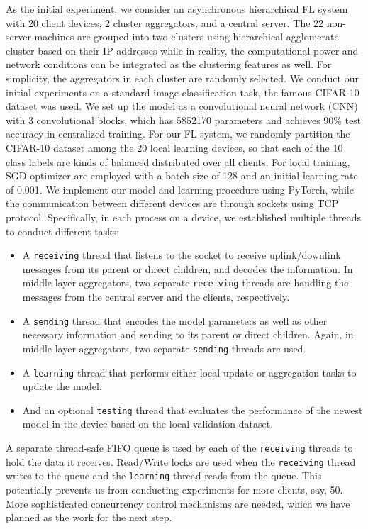 \documentclass[10pt,twocolumn,letterpaper]{article}
\theoremstyle{definition}
\begin{document}
As the initial experiment, we consider an asynchronous hierarchical FL system with 20 client devices, 2 cluster aggregators, and a central server. The 22 non-server machines are grouped into two clusters using hierarchical agglomerate cluster based on their IP addresses while in reality, the computational power and network conditions can be integrated as the clustering features as well. For simplicity, the aggregators in each cluster are randomly selected. We conduct our initial experiments on a standard image classification task, the famous CIFAR-10 dataset was used. We set up the model as a convolutional neural network (CNN) with 3 convolutional blocks, which has 5852170 parameters and achieves 90\% test accuracy in centralized training. For our FL system, we randomly partition the CIFAR-10 dataset among the 20 local learning devices, so that each of the 10 class labels are kinds of balanced distributed over all clients. For local training, SGD optimizer are employed with a batch size of 128 and an initial learning rate of 0.001. We implement our model and learning procedure using PyTorch, while the communication between different devices are through sockets using TCP protocol. Specifically, in each process on a device, we established multiple threads to conduct different tasks: 
\begin{itemize}
    \item A \texttt{receiving} thread that listens to the socket to receive uplink/downlink messages from its parent or direct children, and decodes the information. In middle layer aggregators, two separate \texttt{receiving} threads are handling the messages from the central server and the clients, respectively.
    \item A \texttt{sending} thread that encodes the model parameters as well as other necessary information and sending to its parent or direct children. Again, in middle layer aggregators, two separate \texttt{sending} threads are used.
    \item A \texttt{learning} thread that performs either local update or aggregation tasks to update the model. 
    \item And an optional \texttt{testing} thread that evaluates the performance of the newest model in the device based on the local validation dataset. 
\end{itemize}

A separate thread-safe FIFO queue is used by each of the \texttt{receiving} threads to hold the data it receives. Read/Write locks are used when the \texttt{receiving} thread writes to the queue and the \texttt{learning} thread reads from the queue. This potentially prevents us from conducting experiments for more clients, say, 50. More sophisticated concurrency control mechanisms are needed, which we have planned as the work for the next step. 
\end{document}
